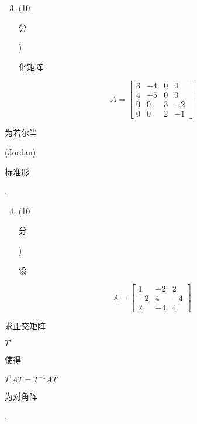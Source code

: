 \documentclass[10pt]{article}
\begin{document}
\begin{enumerate}
  \setcounter{enumi}{2}
  \item (10 \begin{CJK}{UTF8}{mj}分\end{CJK}) \begin{CJK}{UTF8}{mj}化矩阵\end{CJK}
\end{enumerate}
$$
A=\left[\begin{array}{cccc}
3 & -4 & 0 & 0 \\
4 & -5 & 0 & 0 \\
0 & 0 & 3 & -2 \\
0 & 0 & 2 & -1
\end{array}\right]
$$
\begin{CJK}{UTF8}{mj}为若尔当\end{CJK} (Jordan) \begin{CJK}{UTF8}{mj}标准形\end{CJK}.

\begin{enumerate}
  \setcounter{enumi}{3}
  \item (10 \begin{CJK}{UTF8}{mj}分\end{CJK}) \begin{CJK}{UTF8}{mj}设\end{CJK}
\end{enumerate}
$$
A=\left[\begin{array}{ccc}
1 & -2 & 2 \\
-2 & 4 & -4 \\
2 & -4 & 4
\end{array}\right]
$$
\begin{CJK}{UTF8}{mj}求正交矩阵\end{CJK} $T$ \begin{CJK}{UTF8}{mj}使得\end{CJK} $T^{\prime} A T=T^{-1} A T$ \begin{CJK}{UTF8}{mj}为对角阵\end{CJK}.
\end{document}

